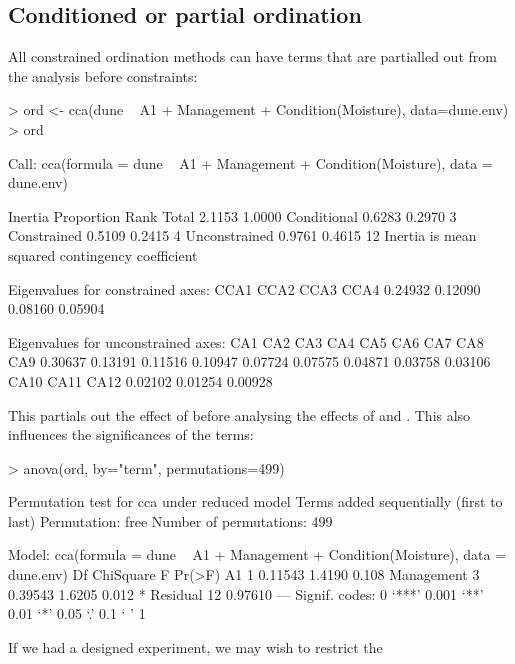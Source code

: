 \documentclass[a4paper,10pt]{article}
\begin{document}
\subsection{Conditioned or partial ordination}

All constrained ordination methods can have terms that are partialled
out from the analysis before constraints:
\begin{Schunk}
\begin{Sinput}
> ord <- cca(dune ~ A1 + Management + Condition(Moisture), data=dune.env)
> ord
\end{Sinput}
\begin{Soutput}
Call: cca(formula = dune ~ A1 + Management +
Condition(Moisture), data = dune.env)

              Inertia Proportion Rank
Total          2.1153     1.0000     
Conditional    0.6283     0.2970    3
Constrained    0.5109     0.2415    4
Unconstrained  0.9761     0.4615   12
Inertia is mean squared contingency coefficient 

Eigenvalues for constrained axes:
   CCA1    CCA2    CCA3    CCA4 
0.24932 0.12090 0.08160 0.05904 

Eigenvalues for unconstrained axes:
    CA1     CA2     CA3     CA4     CA5     CA6     CA7     CA8     CA9 
0.30637 0.13191 0.11516 0.10947 0.07724 0.07575 0.04871 0.03758 0.03106 
   CA10    CA11    CA12 
0.02102 0.01254 0.00928 
\end{Soutput}
\end{Schunk}
This partials out the effect of  before analysing the
effects of  and .  This also influences
the significances of the terms:
\begin{Schunk}
\begin{Sinput}
> anova(ord, by="term", permutations=499)
\end{Sinput}
\begin{Soutput}
Permutation test for cca under reduced model
Terms added sequentially (first to last)
Permutation: free
Number of permutations: 499

Model: cca(formula = dune ~ A1 + Management + Condition(Moisture), data = dune.env)
           Df ChiSquare      F Pr(>F)  
A1          1   0.11543 1.4190  0.108  
Management  3   0.39543 1.6205  0.012 *
Residual   12   0.97610                
---
Signif. codes:  0 ‘***’ 0.001 ‘**’ 0.01 ‘*’ 0.05 ‘.’ 0.1 ‘ ’ 1
\end{Soutput}
\end{Schunk}
If we had a designed experiment, we may wish to restrict the
\end{document}
